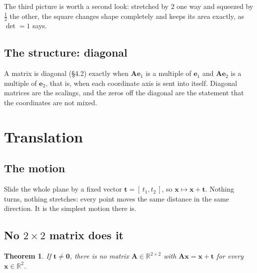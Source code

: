 \documentclass[11pt]{article}
\theoremstyle{plain}
\newtheorem{thm}{Theorem}[section]
\theoremstyle{definition}
\theoremstyle{remark}
\newcommand{\R}{\mathbb{R}}
\newcommand{\vc}[1]{\mathbf{#1}}
\newcommand{\mt}[1]{\mathbf{#1}}
\begin{document}
\noindent The third picture is worth a second look: stretched by $2$ one way
and squeezed by $\tfrac12$ the other, the square changes shape completely and
keeps its area exactly, as $\det=1$ says.

\subsection{The structure: diagonal}
A matrix is diagonal (\S4.2) exactly when $\mt{A}\vc{e}_1$ is a multiple of
$\vc{e}_1$ and $\mt{A}\vc{e}_2$ is a multiple of $\vc{e}_2$, that is, when each
coordinate axis is sent into itself. Diagonal matrices are the scalings, and the
zeros off the diagonal are the statement that the coordinates are not mixed.

\section{Translation}

\subsection{The motion}
Slide the whole plane by a fixed vector $\vc{t}=[\,t_1,t_2\,]$, so
$\vc{x}\mapsto\vc{x}+\vc{t}$. Nothing turns, nothing stretches: every point
moves the same distance in the same direction. It is the simplest motion there
is.

\subsection{No \texorpdfstring{$2\times2$}{2x2} matrix does it}
\begin{thm}
\label{thm:notranslate}
If $\vc{t}\neq\vc{0}$, there is no matrix $\mt{A}\in\R^{2\times2}$ with
$\mt{A}\vc{x}=\vc{x}+\vc{t}$ for every $\vc{x}\in\R^{2}$.
\end{thm}
\end{document}
